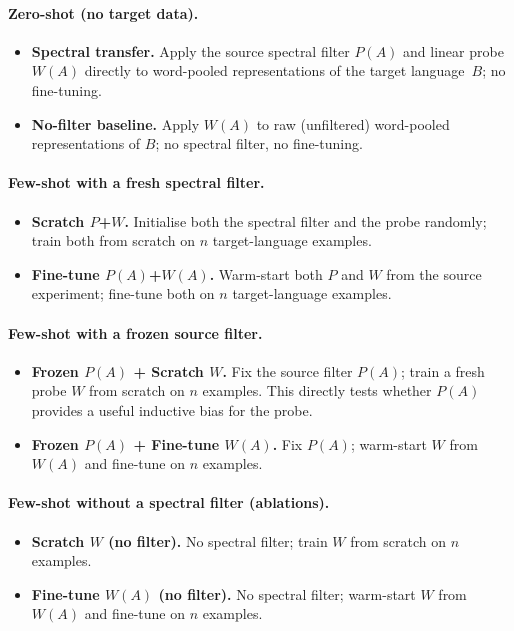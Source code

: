 \paragraph{Zero-shot (no target data).}
\begin{itemize}
  \item[\textbf{(1)}] \textbf{Spectral transfer.}
        Apply the source spectral filter $P(A)$ and linear probe
        $W(A)$ directly to word-pooled representations of the target
        language~$B$; no fine-tuning.
  \item[\textbf{(2)}] \textbf{No-filter baseline.}
        Apply $W(A)$ to raw (unfiltered) word-pooled representations
        of $B$; no spectral filter, no fine-tuning.
\end{itemize}

\paragraph{Few-shot with a fresh spectral filter.}
\begin{itemize}
  \item[\textbf{(3a)}] \textbf{Scratch $P$+$W$.}
        Initialise both the spectral filter and the probe randomly;
        train both from scratch on $n$ target-language examples.
  \item[\textbf{(3b)}] \textbf{Fine-tune $P(A)$+$W(A)$.}
        Warm-start both $P$ and $W$ from the source experiment;
        fine-tune both on $n$ target-language examples.
\end{itemize}

\paragraph{Few-shot with a frozen source filter.}
\begin{itemize}
  \item[\textbf{(4a)}] \textbf{Frozen $P(A)$ + Scratch $W$.}
        Fix the source filter $P(A)$; train a fresh probe $W$
        from scratch on $n$ examples.  This directly tests whether
        $P(A)$ provides a useful inductive bias for the probe.
  \item[\textbf{(4b)}] \textbf{Frozen $P(A)$ + Fine-tune $W(A)$.}
        Fix $P(A)$; warm-start $W$ from $W(A)$ and fine-tune on
        $n$ examples.
\end{itemize}

\paragraph{Few-shot without a spectral filter (ablations).}
\begin{itemize}
  \item[\textbf{(5a)}] \textbf{Scratch $W$ (no filter).}
        No spectral filter; train $W$ from scratch on $n$ examples.
  \item[\textbf{(5b)}] \textbf{Fine-tune $W(A)$ (no filter).}
        No spectral filter; warm-start $W$ from $W(A)$ and
        fine-tune on $n$ examples.
\end{itemize}


